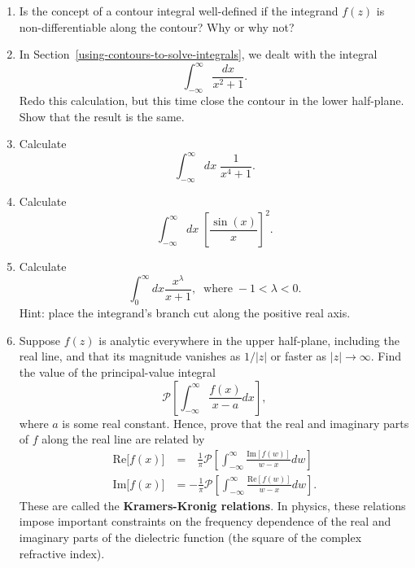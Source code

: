 \documentclass[10pt,a4paper]{article}
\begin{document}
\begin{enumerate}
\item
  Is the concept of a contour integral well-defined if the integrand
  $f(z)$ is non-differentiable along the contour? Why or why not?

\item
  In Section~\ref{using-contours-to-solve-integrals}, we dealt with
  the integral
  \begin{equation}
    \int_{-\infty}^\infty \frac{dx}{x^2 + 1}.
  \end{equation}
  Redo this calculation, but this time close the contour in the lower
  half-plane.  Show that the result is the same.

\item
  Calculate
  \begin{equation}
    \int_{-\infty}^\infty dx\; \frac{1}{x^4 + 1}.
  \end{equation}

\item
  Calculate
  \begin{equation}
    \int_{-\infty}^\infty dx\; \left[\frac{\sin(x)}{x}\right]^2.
  \end{equation}

\item
  Calculate
  \begin{equation}
    \int_0^\infty dx \frac{x^{\lambda}}{x+1}, \;\;\mathrm{where}\; -1 < \lambda < 0.
  \end{equation}
  Hint: place the integrand's branch cut along the positive real axis.

\item
    Suppose \(f(z)\) is analytic everywhere in the upper half-plane,
  including the real line, and that its magnitude vanishes as \(1/|z|\)
  or faster as \(|z| \rightarrow \infty\). Find the value of the
  principal-value integral
  \begin{equation}
    \mathcal{P}\left[\int_{-\infty}^\infty \frac{f(x)}{x-a} dx \right],
  \end{equation}
  where \(a\) is some real constant. Hence, prove that the real and
  imaginary parts of \(f\) along the real line are related by
  \begin{align}
    \mathrm{Re}\big[f(x)\big]
    &= \;\;\,\frac{1}{\pi} \mathcal{P}\left[\int_{-\infty}^\infty
      \frac{\mathrm{Im}[f(w)]}{w-x} dw\right]
    \\ \mathrm{Im}\big[f(x)\big]
    &= -\frac{1}{\pi} \mathcal{P}\left[\int_{-\infty}^\infty
      \frac{\mathrm{Re}[f(w)]}{w-x} dw\right].
  \end{align}
  These are called the \textbf{Kramers-Kronig relations}. In physics,
  these relations impose important constraints on the frequency
  dependence of the real and imaginary parts of the dielectric
  function (the square of the complex refractive index).
\end{enumerate}
\end{document}
